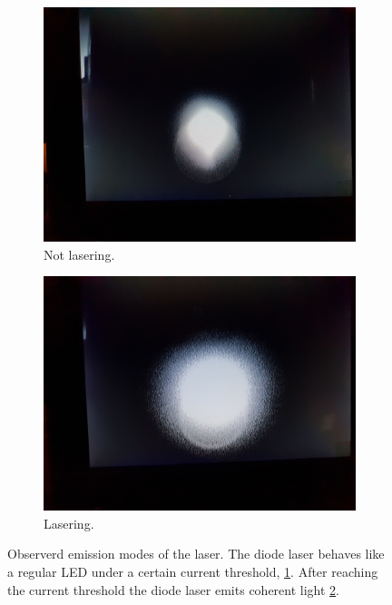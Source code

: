 \begin{figure}
  \centering
      \begin{subfigure}{0.48\textwidth}
          \centering
          \includegraphics[width = \textwidth]{./content/images/diodelaser_not_lasering.jpg}
          \caption{Not lasering.}
          \label{fig:not_lasering}
      \end{subfigure}
      \begin{subfigure}{0.48\textwidth}
          \centering
          \includegraphics[width = \textwidth]{./content/images/diodelaser_lasering.jpg}
          \caption{Lasering.}
          \label{fig:lasering}
      \end{subfigure}
  \caption{Observerd emission modes of the laser. The diode laser behaves like a regular
  LED under a certain current threshold, \ref{fig:not_lasering}. After reaching the
  current threshold the diode laser emits coherent light \ref{fig:lasering}. }
\label{fig: emission_modes}
\end{figure}
